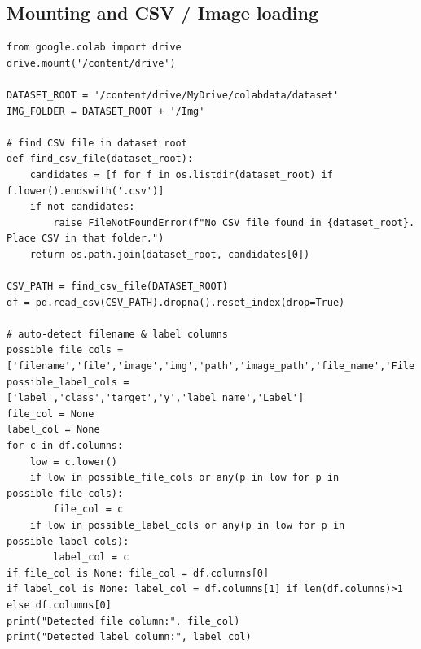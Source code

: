 \documentclass[11pt,a4paper]{article}
\begin{document}
\subsection{Mounting and CSV / Image loading}
\begin{lstlisting}[caption={Mount Drive and auto-detect CSV + load filenames}]
from google.colab import drive
drive.mount('/content/drive')

DATASET_ROOT = '/content/drive/MyDrive/colabdata/dataset'
IMG_FOLDER = DATASET_ROOT + '/Img'

# find CSV file in dataset root
def find_csv_file(dataset_root):
    candidates = [f for f in os.listdir(dataset_root) if f.lower().endswith('.csv')]
    if not candidates:
        raise FileNotFoundError(f"No CSV file found in {dataset_root}. Place CSV in that folder.")
    return os.path.join(dataset_root, candidates[0])

CSV_PATH = find_csv_file(DATASET_ROOT)
df = pd.read_csv(CSV_PATH).dropna().reset_index(drop=True)

# auto-detect filename & label columns
possible_file_cols = ['filename','file','image','img','path','image_path','file_name','File']
possible_label_cols = ['label','class','target','y','label_name','Label']
file_col = None
label_col = None
for c in df.columns:
    low = c.lower()
    if low in possible_file_cols or any(p in low for p in possible_file_cols):
        file_col = c
    if low in possible_label_cols or any(p in low for p in possible_label_cols):
        label_col = c
if file_col is None: file_col = df.columns[0]
if label_col is None: label_col = df.columns[1] if len(df.columns)>1 else df.columns[0]
print("Detected file column:", file_col)
print("Detected label column:", label_col)
\end{lstlisting}
\end{document}

